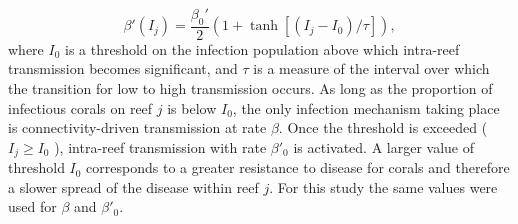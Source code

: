 \documentclass[utf8]{frontiersSCNS}
\begin{document}
\begin{equation}
    \beta'(I_j) = \dfrac{\beta_0'}{2}(1+\tanh[(I_j-I_0)/\tau]),\label{eq:beta}
\end{equation}
where $I_0$ is a threshold on the infection population above which intra-reef transmission becomes significant, and $\tau$ is a measure of the interval over which the transition for low to high transmission occurs. As long as the proportion of infectious corals on reef $j$ is below $I_0$, the only infection mechanism taking place is connectivity-driven transmission at rate $\beta$. Once the threshold is exceeded ( $I_j \geq I_0$ ), intra-reef transmission with rate $\beta'_0$ is activated. A larger value of threshold $I_0$ corresponds to a greater resistance to disease for corals and therefore a slower spread of the disease within reef $j$. For this study the same values were used for $\beta$ and $\beta'_0$.
\end{document}
